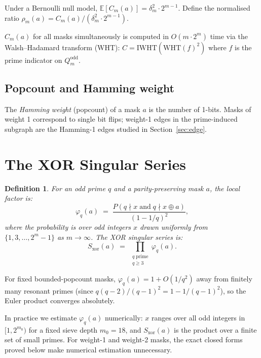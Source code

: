 \documentclass[12pt]{article}
\newtheorem{definition}{Definition}
\newcommand{\E}{\mathbb{E}}
\begin{document}
Under a Bernoulli null model, $\E[C_m(a)] = \delta_m^2 \cdot 2^{m-1}$.
Define the normalised ratio $\rho_m(a) = C_m(a)/(\delta_m^2 \cdot 2^{m-1})$.

$C_m(a)$ for all masks simultaneously is computed in $O(m \cdot 2^m)$ time
via the Walsh--Hadamard transform (WHT):
$C = \mathrm{IWHT}(\mathrm{WHT}(f)^2)$
where $f$ is the prime indicator on $Q_m^{\mathrm{odd}}$.

\subsection{Popcount and Hamming weight}

The \emph{Hamming weight} (popcount) of a mask $a$ is the number of 1-bits.
Masks of weight 1 correspond to single bit flips; weight-1 edges in the
prime-induced subgraph are the Hamming-1 edges studied in Section~\ref{sec:edge}.

\section{The XOR Singular Series}
\label{sec:series}

\begin{definition}
For an odd prime $q$ and a parity-preserving mask $a$,
the \emph{local factor} is:
\[
  \varphi_q(a)
  \;=\;
  \frac{P(q \nmid x \;\text{and}\; q \nmid x \oplus a)}{(1 - 1/q)^2},
\]
where the probability is over odd integers $x$ drawn uniformly from
$\{1,3,\ldots,2^m-1\}$ as $m \to \infty$.
The \emph{XOR singular series} is:
\[
  S_{\mathrm{xor}}(a)
  \;=\;
  \prod_{\substack{q\;\mathrm{prime} \\ q \geq 3}} \varphi_q(a).
\]
\end{definition}

For fixed bounded-popcount masks, $\varphi_q(a) = 1 + O(1/q^2)$
away from finitely many resonant primes (since $q(q-2)/(q-1)^2 = 1 - 1/(q-1)^2$),
so the Euler product converges absolutely.

In practice we estimate $\varphi_q(a)$ numerically:
$x$ ranges over all odd integers in $[1, 2^{m_0})$ for a fixed sieve depth $m_0 = 18$,
and $S_{\mathrm{xor}}(a)$ is the product over a finite set of small primes.
For weight-1 and weight-2 masks, the exact closed forms proved below
make numerical estimation unnecessary.

\end{document}
